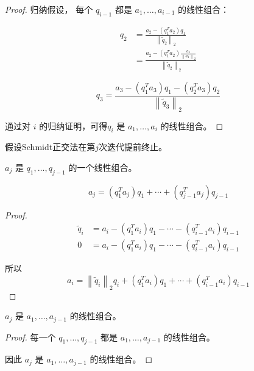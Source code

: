 \begin{proof}
    归纳假设， 每个 $ q_{i-1} $ 都是 $ a_{1}, \ldots, a_{i-1} $ 的线性组合：

    \begin{equation} \begin{aligned}q_{2}&= \frac{a_{2}-\left(q_{1}^{T} a_{2}\right) q_{1}}{\left\|\tilde{q}_{2}\right\|_{2}}
        \\ &=
        \frac{a_{2}-\left(q_{1}^{T} a_{2}\right) \frac{ a_{1} }{\left\|a_{1}\right\|_{2}} }{\left\|\tilde{q}_{2}\right\|_{2}}
    \end{aligned} \end{equation}

\begin{equation} q_{3}=
\frac{a_{3}-\left(q_{1}^{T} a_{3}\right) q_{1}-\left(q_{2}^{T} a_{3}\right) q_{2}}{\left\|\tilde{q}_{3}\right\|_2 }  \end{equation}

通过对 $ i $ 的归纳证明，可得$ q_{i} $ 是 $ a_{1}, \ldots, a_{i} $ 的线性组合。
\end{proof}


假设Schmidt正交法在第$j$次迭代提前终止。

\begin{corollary}
    $ a_{j} $ 是 $ q_{1}, \ldots, q_{j-1} $ 的一个线性组合。

\begin{equation} a_{j}=\left(q_{1}^{T} a_{j}\right) q_{1}+\cdots+\left(q_{j-1}^{T} a_{j}\right) q_{j-1} \end{equation}
\end{corollary}


\begin{proof}
    \begin{equation}\begin{aligned}
        \tilde{q}_{i} &=a_{i}-\left(q_{1}^{T} a_{i}\right) q_{1}-\cdots-\left(q_{i-1}^{T} a_{i}\right) q_{i-1} \\
        0 &=a_{i}-\left(q_{1}^{T} a_{i}\right) q_{1}-\cdots-\left(q_{i-1}^{T} a_{i}\right) q_{i-1}
    \end{aligned}\end{equation}

    所以
    \begin{equation} a_{i}=\left\|\tilde{q}_{i}\right\|_{2} q_{i}+\left(q_{1}^{T} a_{i}\right) q_{1}+\cdots+\left(q_{i-1}^{T} a_{i}\right) q_{i-1} \end{equation}
\end{proof}

\begin{corollary}
    $ a_{j} $ 是 $ a_{1}, \ldots, a_{j-1} $ 的线性组合。
\end{corollary}

\begin{proof}
    每一个 $ q_{1}, \ldots, q_{j-1} $ 都是 $ a_{1}, \ldots, a_{j-1} $ 的线性组合。

    因此 $ a_{j} $ 是 $ a_{1}, \ldots, a_{j-1} $ 的线性组合。
\end{proof}
